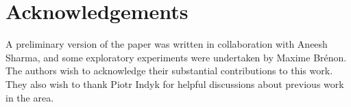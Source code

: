 \section*{Acknowledgements}
A preliminary version of the paper was written in collaboration with
Aneesh Sharma, and some exploratory experiments were undertaken by
Maxime Br\'enon. The authors wish to acknowledge their substantial
contributions to this work. They also wish to thank Piotr Indyk for
helpful discussions about previous work in the area.

